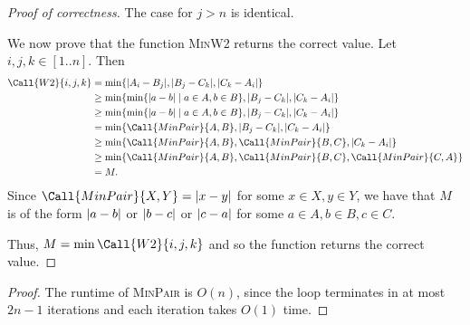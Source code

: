 \documentclass[12pt]{article}
\begin{document}
\begin{solution}
\begin{enumerate}[wide]
\begin{proof}[Proof of correctness]
                The case for $j > n$ is identical.

                We now prove that the function \textsc{MinW2} returns the correct value.
                Let $i, j, k \in [1..n]$.
                Then
                \begin{align*}
                    \Call{W2}{i, j, k} &= \min\set{\abs{A_{i} - B_{j}}, \abs{B_{j} - C_{k}}, \abs{C_{k} - A_{i}}} \\
                                       &\geq \min\set{\min\set{\abs{a - b} \mid a \in A, b \in B}, \abs{B_{j} - C_{k}}, \abs{C_{k} - A_{i}}} \\
                                       &\geq \min\set{\min\set{\abs{a - b} \mid a \in A, b \in B}, \abs{B_{j} - C_{k}}, \abs{C_{k} - A_{i}}} \\
                                       &= \min\set{\Call{MinPair}{A, B}, \abs{B_{j} - C_{k}}, \abs{C_{k} - A_{i}}} \\
                                       &\geq \min\set{\Call{MinPair}{A, B}, \Call{MinPair}{B, C}, \abs{C_{k} - A_{i}}} \\
                                       &\geq \min\set{\Call{MinPair}{A, B}, \Call{MinPair}{B, C}, \Call{MinPair}{C, A}} \\
                                       &= M.
                \end{align*}
                Since $\Call{MinPair}{X, Y} = \abs{x - y}$ for some $x \in X, y \in Y$,
                we have that $M$ is of the form $\abs{a - b}$ or $\abs{b - c}$ or $\abs{c - a}$
                for some $a \in A, b \in B, c \in C$.

                Thus, $M = \min\Call{W2}{i, j, k}$ and so the function returns
                the correct value.
            \end{proof}
            \begin{proof}
                The runtime of \textsc{MinPair} is $O(n)$, since the loop
                terminates in at most $2n - 1$ iterations and each iteration
                takes $O(1)$ time.


\end{proof}
\end{enumerate}
\end{solution}
\end{document}
